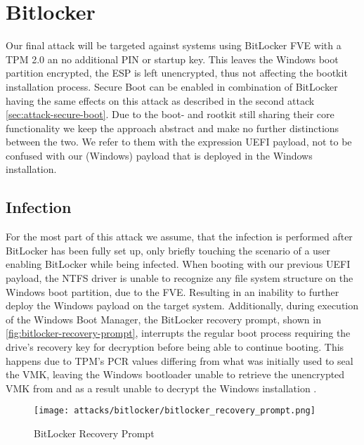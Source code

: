 \section{Bitlocker}

Our final attack will be targeted against systems using BitLocker \ac{FVE} with a \ac{TPM} 2.0 an no additional PIN or startup key.
This leaves the Windows boot partition encrypted, the \ac{ESP} is left unencrypted, thus not affecting the bootkit installation process.
Secure Boot can be enabled in combination of BitLocker having the same effects on this attack as described in the second attack \autoref{sec:attack-secure-boot}.
Due to the boot- and rootkit still sharing their core functionality we keep the approach abstract and make no further distinctions between the two.
We refer to them with the expression \ac{UEFI} payload, not to be confused with our (Windows) payload that is deployed in the Windows installation.

\subsection{Infection}

For the most part of this attack we assume, that the infection is performed after BitLocker has been fully set up, only briefly touching the scenario of a user enabling BitLocker while being infected.
When booting with our previous \ac{UEFI} payload, the \ac{NTFS} driver is unable to recognize any file system structure  on the Windows boot partition, due to the \ac{FVE}.
Resulting in an inability to further deploy the Windows payload on the target system.
Additionally, during execution of the Windows Boot Manager, the BitLocker recovery prompt, shown in \autoref{fig:bitlocker-recovery-prompt}, interrupts the regular boot process requiring the drive's recovery key for decryption before being able to continue booting.
This happens due to \ac{TPM}'s \ac{PCR} values differing from what was initially used to seal the \ac{VMK}, leaving the Windows bootloader unable to retrieve the unencrypted \ac{VMK} from and as a result unable to decrypt the Windows installation \cite[12.]{windows-internals-7-part2}.

\begin{figure}[htb]
    \centering
    \texttt{[image: attacks/bitlocker/bitlocker\_recovery\_prompt.png]}
    \caption{BitLocker Recovery Prompt}
    \label{fig:bitlocker-recovery-prompt}
\end{figure}

